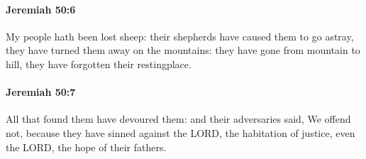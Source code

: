 		\paragraph{Jeremiah 50:6} %
			\label{JEREMIAH-50-6}

			My people hath been lost sheep: their shepherds have caused them to go astray, they have turned them away on the mountains: they have gone from mountain to hill, they have forgotten their restingplace.


		\paragraph{Jeremiah 50:7} %
			\label{JEREMIAH-50-7}

			All that found them have devoured them: and their adversaries said, We offend not, because they have sinned against the LORD, the habitation of justice, even the LORD, the hope of their fathers.

